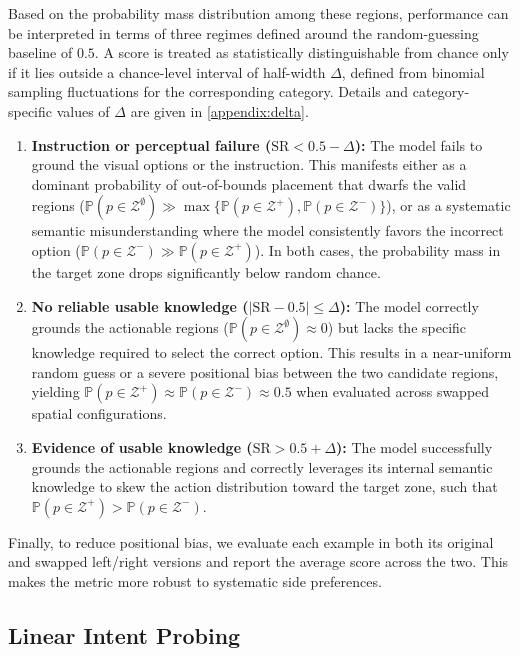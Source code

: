\documentclass{llmxive}
\begin{document}
Based on the probability mass distribution among these regions, performance can be interpreted in terms of three regimes defined around the random-guessing baseline of $0.5$. A score is treated as statistically distinguishable from chance only if it lies outside a chance-level interval of half-width $\Delta$, defined from binomial sampling fluctuations for the corresponding category. Details and category-specific values of $\Delta$ are given in \autoref{appendix:delta}.
\begin{enumerate}
    \item \textbf{Instruction or perceptual failure ($\text{SR} < 0.5 - \Delta$):} The model fails to ground the visual options or the instruction. This manifests either as a dominant probability of out-of-bounds placement that dwarfs the valid regions ($\mathbb{P}(p \in \mathcal{Z}^{\emptyset}) \gg \max\{\mathbb{P}(p \in \mathcal{Z}^+), \mathbb{P}(p \in \mathcal{Z}^-)\}$), or as a systematic semantic misunderstanding where the model consistently favors the incorrect option ($\mathbb{P}(p \in \mathcal{Z}^-) \gg \mathbb{P}(p \in \mathcal{Z}^+)$). In both cases, the probability mass in the target zone drops significantly below random chance.
    \item \textbf{No reliable usable knowledge ($|\text{SR} - 0.5| \le \Delta$):} The model correctly grounds the actionable regions ($\mathbb{P}(p \in \mathcal{Z}^{\emptyset}) \approx 0$) but lacks the specific knowledge required to select the correct option. This results in a near-uniform random guess or a severe positional bias between the two candidate regions, yielding $\mathbb{P}(p \in \mathcal{Z}^+) \approx \mathbb{P}(p \in \mathcal{Z}^-) \approx 0.5$ when evaluated across swapped spatial configurations.
    \item \textbf{Evidence of usable knowledge ($\text{SR} > 0.5 + \Delta$):} The model successfully grounds the actionable regions and correctly leverages its internal semantic knowledge to skew the action distribution toward the target zone, such that $\mathbb{P}(p \in \mathcal{Z}^+) > \mathbb{P}(p \in \mathcal{Z}^-)$.
\end{enumerate}
Finally, to reduce positional bias, we evaluate each example in both its original and swapped left/right versions and report the average score across the two. This makes the metric more robust to systematic side preferences.

\subsection{Linear Intent Probing}
\end{document}
